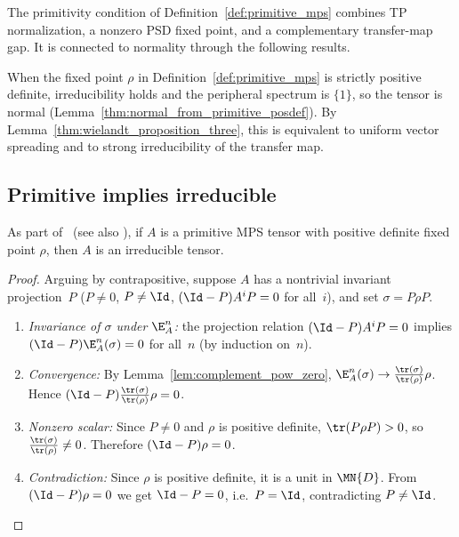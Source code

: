 The primitivity condition of Definition~\ref{def:primitive_mps}
combines TP normalization, a nonzero PSD fixed point, and a complementary
transfer-map gap. It is connected to normality through the following results.

\begin{remark}%
    \label{rem:prim_definition_mismatch}\leanok
    When the fixed point $\rho$ in Definition~\ref{def:primitive_mps} is strictly
    positive definite, irreducibility holds and the peripheral spectrum is
    $\{1\}$, so the tensor is normal
    (Lemma~\ref{thm:normal_from_primitive_posdef}). By
    Lemma~\ref{thm:wielandt_proposition_three}, this is equivalent to uniform
    vector spreading and to strong irreducibility of the transfer map.
\end{remark}

\subsection{Primitive implies irreducible}\label{subsec:prim_implies_irred}

\begin{lemma}%
    \label{lem:primitive_implies_irreducible}
    \leanok
    As part of~\cite[Proposition~3]{Sanz2010Quantum} (see also
    \cite[Section~2.3]{Cirac2016MPDO_arXiv}), if $A$ is a primitive MPS tensor
    with positive definite fixed point $\rho$, then $A$ is an irreducible
    tensor.
\end{lemma}

\begin{proof}
    \leanok
    Arguing by contrapositive, suppose $A$ has a nontrivial invariant
    projection~$P$ ($P\neq0$, $P\neq\Id$, $(\Id-P)A^iP=0$ for all~$i$), and
    set $\sigma=P\rho P$.
    \begin{enumerate}
        \item \emph{Invariance of $\sigma$ under $\E_A^n$:}
              the projection relation
              $(\Id-P)A^iP=0$ implies
              $(\Id-P)\E_A^n(\sigma)=0$ for all~$n$
              (by induction on~$n$).
        \item \emph{Convergence:}
              By Lemma~\ref{lem:complement_pow_zero},
              $\E_A^n(\sigma)\to\frac{\tr(\sigma)}{\tr(\rho)}\rho$.
              Hence
              $(\Id-P)\frac{\tr(\sigma)}{\tr(\rho)}\rho=0$.
        \item \emph{Nonzero scalar:}
              Since $P\neq0$ and $\rho$ is positive definite,
              $\tr(P\rho P)>0$, so
              $\frac{\tr(\sigma)}{\tr(\rho)}\neq0$.
              Therefore $(\Id-P)\rho=0$.
        \item \emph{Contradiction:}
              Since $\rho$ is positive definite, it is a unit
              in $\MN{D}$.
              From $(\Id-P)\rho=0$ we get $\Id-P=0$,
              i.e.\ $P=\Id$, contradicting $P\neq\Id$.
    \end{enumerate}
\end{proof}

